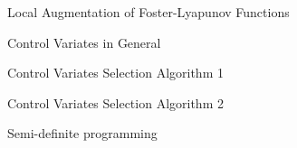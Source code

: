 \documentclass[10pt]{beamer}
\begin{document}
\begin{frame}{Local Augmentation of Foster-Lyapunov Functions}
\end{frame}

\begin{frame}{Control Variates in General}
\end{frame}

\begin{frame}{Control Variates Selection Algorithm 1}
\end{frame}

\begin{frame}{Control Variates Selection Algorithm 2}
\end{frame}

\begin{frame}{Semi-definite programming}
\end{frame}
\fi
\end{document}
